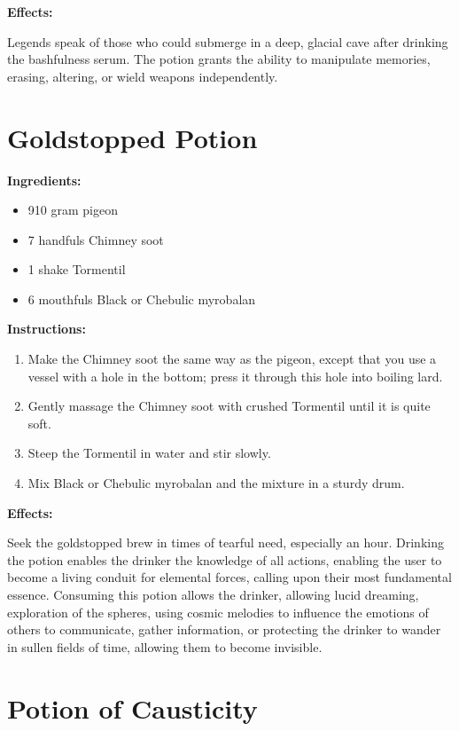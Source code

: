 \documentclass{article}
\begin{document}
\textbf{Effects:}

Legends speak of those who could submerge in a deep, glacial cave after drinking the bashfulness serum. The potion grants the ability to manipulate memories, erasing, altering, or wield weapons independently.

\newpage
\section*{Goldstopped Potion}

\textbf{Ingredients:}

\begin{itemize}
  \item 910 gram pigeon
  \item 7 handfuls Chimney soot
  \item 1 shake Tormentil
  \item 6 mouthfuls Black or Chebulic myrobalan
\end{itemize}

\textbf{Instructions:}

\begin{enumerate}
  \item Make the Chimney soot the same way as the pigeon, except that you use a vessel with a hole in the bottom; press it through this hole into boiling lard.
  \item Gently massage the Chimney soot with crushed Tormentil until it is quite soft.
  \item Steep the Tormentil in water and stir slowly.
  \item Mix Black or Chebulic myrobalan and the mixture in a sturdy drum.
\end{enumerate}

\textbf{Effects:}

Seek the goldstopped brew in times of tearful need, especially an hour. Drinking the potion enables the drinker the knowledge of all actions, enabling the user to become a living conduit for elemental forces, calling upon their most fundamental essence. Consuming this potion allows the drinker, allowing lucid dreaming, exploration of the spheres, using cosmic melodies to influence the emotions of others to communicate, gather information, or protecting the drinker to wander in sullen fields of time, allowing them to become invisible.

\newpage
\section*{Potion of Causticity}
\end{document}
